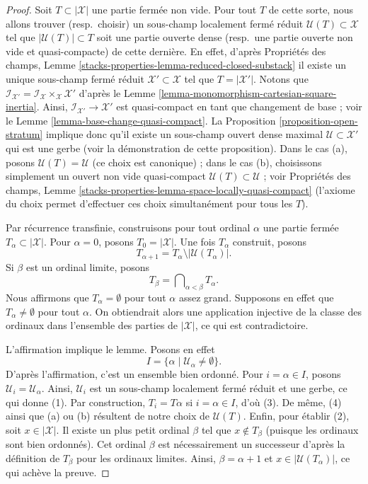 \begin{proof}
Soit $T \subset |\mathcal{X}|$ une partie fermée non vide. Pour tout $T$ de
cette sorte, nous allons trouver (resp.\ choisir) un sous-champ localement
fermé réduit $\mathcal{U}(T) \subset \mathcal{X}$ tel que
$|\mathcal{U}(T)| \subset T$ soit une partie ouverte dense
(resp.\ une partie ouverte non vide et quasi-compacte) de cette dernière. En effet,
d'après Propriétés des champs, Lemme
\ref{stacks-properties-lemma-reduced-closed-substack}
il existe un unique sous-champ fermé réduit
$\mathcal{X}' \subset \mathcal{X}$ tel que $T = |\mathcal{X}'|$.
Notons que $\mathcal{I}_{\mathcal{X}'} =
\mathcal{I}_\mathcal{X} \times_\mathcal{X} \mathcal{X}'$ d'après le
Lemme \ref{lemma-monomorphism-cartesian-square-inertia}.
Ainsi, $\mathcal{I}_{\mathcal{X}'} \to \mathcal{X}'$ est quasi-compact en
tant que changement de base ; voir le
Lemme \ref{lemma-base-change-quasi-compact}. La
Proposition \ref{proposition-open-stratum} implique donc qu'il existe un
sous-champ ouvert dense maximal $\mathcal{U} \subset \mathcal{X}'$ qui est
une gerbe (voir la démonstration de cette proposition). Dans le cas (a),
posons $\mathcal{U}(T) = \mathcal{U}$ (ce choix est canonique) ; dans le cas
(b), choisissons simplement un ouvert non vide quasi-compact
$\mathcal{U}(T) \subset \mathcal{U}$ ; voir Propriétés des champs, Lemme
\ref{stacks-properties-lemma-space-locally-quasi-compact}
(l'axiome du choix permet d'effectuer ces choix simultanément pour tous les
$T$).

\medskip\noindent
Par récurrence transfinie, construisons pour tout ordinal $\alpha$ une partie
fermée $T_\alpha \subset |\mathcal{X}|$. Pour $\alpha = 0$, posons
$T_0 = |\mathcal{X}|$. Une fois $T_\alpha$ construit, posons
$$
T_{\alpha + 1} = T_\alpha \setminus |\mathcal{U}(T_\alpha)|.
$$
Si $\beta$ est un ordinal limite, posons
$$
T_\beta = \bigcap\nolimits_{\alpha < \beta} T_\alpha.
$$
Nous affirmons que $T_\alpha = \emptyset$ pour tout $\alpha$ assez grand.
Supposons en effet que $T_\alpha \not = \emptyset$ pour tout $\alpha$.
On obtiendrait alors une application injective de la classe des ordinaux dans
l'ensemble des parties de $|\mathcal{X}|$, ce qui est contradictoire.

\medskip\noindent
L'affirmation implique le lemme. Posons en effet
$$
I = \{\alpha \mid \mathcal{U}_\alpha \not = \emptyset \}.
$$
D'après l'affirmation, c'est un ensemble bien ordonné. Pour
$i = \alpha \in I$, posons $\mathcal{U}_i = \mathcal{U}_\alpha$.
Ainsi, $\mathcal{U}_i$ est un sous-champ localement fermé réduit et une
gerbe, ce qui donne (1). Par construction, $T_i = T\alpha$ si
$i = \alpha \in I$, d'où (3). De même, (4) ainsi que (a) ou (b) résultent
de notre choix de $\mathcal{U}(T)$. Enfin, pour établir (2), soit
$x \in |\mathcal{X}|$. Il existe un plus petit ordinal $\beta$ tel que
$x \not \in T_\beta$ (puisque les ordinaux sont bien ordonnés). Cet ordinal
$\beta$ est nécessairement un successeur d'après la définition de $T_\beta$
pour les ordinaux limites. Ainsi, $\beta = \alpha + 1$ et
$x \in |\mathcal{U}(T_\alpha)|$, ce qui achève la preuve.
\end{proof}

